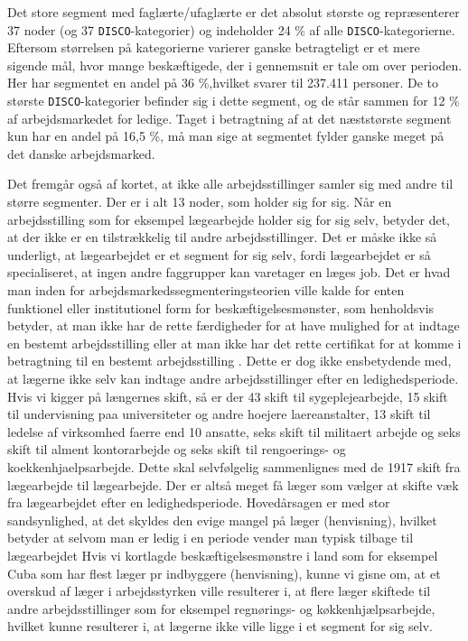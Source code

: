 Det store segment med faglærte/ufaglærte er det absolut største og repræsenterer 37 noder (og 37 \texttt{DISCO}-kategorier) og indeholder 24 \% af alle \texttt{DISCO}-kategorierne. Eftersom størrelsen på kategorierne varierer ganske betragteligt er et mere sigende mål, hvor mange beskæftigede, der i gennemsnit er tale om over perioden. Her har segmentet en andel på 36 \%,hvilket svarer til 237.411 personer. De to største \texttt{DISCO}-kategorier befinder sig i dette segment, og de står sammen for 12 \% af arbejdsmarkedet for ledige. Taget i betragtning af at det næststørste segment kun har en andel på 16,5 \%, må man sige at segmentet fylder ganske meget på det danske arbejdsmarked. 

Det fremgår også af kortet, at ikke alle arbejdsstillinger samler sig med andre til større segmenter. Der er i alt 13 noder, som holder sig for sig. Når en arbejdsstilling som for eksempel lægearbejde holder sig for sig selv, betyder det, at der ikke er en tilstrækkelig til andre arbejdsstillinger. Det er måske ikke så underligt, at lægearbejdet er et segment for sig selv, fordi lægearbejdet er så specialiseret, at ingen andre faggrupper kan varetager en læges job. Det er hvad man inden for arbejdsmarkedssegmenteringsteorien ville kalde for enten funktionel eller institutionel form for beskæftigelsesmønster, som henholdsvis betyder, at man ikke har de rette færdigheder for at have mulighed for at indtage en bestemt arbejdsstilling eller at man ikke har det rette certifikat for at komme i betragtning til en bestemt arbejdsstilling \parencite[3]{TouboelLarsenJensen2013} \parencite[4]{TouboelLarsen2015}. Dette er dog ikke ensbetydende med, at lægerne ikke selv kan indtage andre arbejdsstillinger efter en ledighedsperiode. Hvis vi kigger på længernes skift, så er der 43 skift til sygeplejearbejde, 15 skift til undervisning paa universiteter og andre hoejere laereanstalter, 13 skift til ledelse af virksomhed faerre end 10 ansatte, seks skift til militaert arbejde og seks skift til alment kontorarbejde og seks skift til rengoerings- og koekkenhjaelpsarbejde. Dette skal selvfølgelig sammenlignes med de 1917 skift fra lægearbejde til lægearbejde. Der er altså meget få læger som vælger at skifte væk fra lægearbejdet efter en ledighedsperiode. Hovedårsagen er med stor sandsynlighed, at det skyldes den evige mangel på læger (henvisning), hvilket betyder at selvom man er ledig i en periode vender man typisk tilbage til lægearbejdet %
Hvis vi kortlagde beskæftigelsesmønstre i  land som for eksempel Cuba som har flest læger pr indbyggere (henvisning), kunne vi gisne om, at et overskud af læger i arbejdsstyrken ville resulterer i, at flere læger skiftede til andre arbejdsstillinger som for eksempel regnørings- og køkkenhjælpsarbejde, hvilket kunne resulterer i, at lægerne ikke ville ligge i et segment for sig selv.

